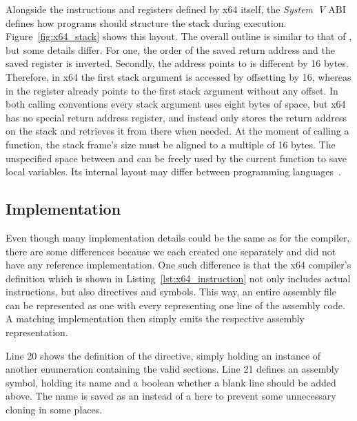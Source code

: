 Alongside the instructions and registers defined by x64 itself, the \emph{System~V} ABI defines how programs should structure the stack during execution.
Figure~\ref{fig:x64_stack} shows this layout.
The overall outline is similar to that of \riscv{}, but some details differ.
For one, the order of the saved return address and the saved  register is inverted.
Secondly, the address  points to is different by 16 bytes.
Therefore, in x64 the first stack argument is accessed by offsetting  by 16, whereas in \riscv{} the  register already points to the first stack argument without any offset.
In both calling conventions every stack argument uses eight bytes of space, but x64 has no special return address register, and instead only stores the return address on the stack and retrieves it from there when needed.
At the moment of calling a function, the stack frame's size must be aligned to a multiple of 16 bytes.
The unspecified space between  and  can be freely used by the current function to save local variables.
Its internal layout may differ between programming languages~\cite[p.~21]{Lu2022}.

\subsection{Implementation}


Even though many implementation details could be the same as for the \riscv{} compiler, there are some differences because we each created one separately and did not have any reference implementation.
One such difference is that the x64 compiler's  definition which is shown in Listing~\ref{lst:x64_instruction} not only includes actual instructions, but also directives and symbols.
This way, an entire assembly file can be represented as one  with every  representing one line of the assembly code.
A matching  implementation then simply emits the respective assembly representation.

Line 20 shows the definition of the  directive, simply holding an instance of another enumeration containing the valid sections.
Line 21 defines an assembly symbol, holding its name and a boolean whether a blank line should be added above.
The name is saved as an  instead of a  here to prevent some unnecessary cloning in some places.

